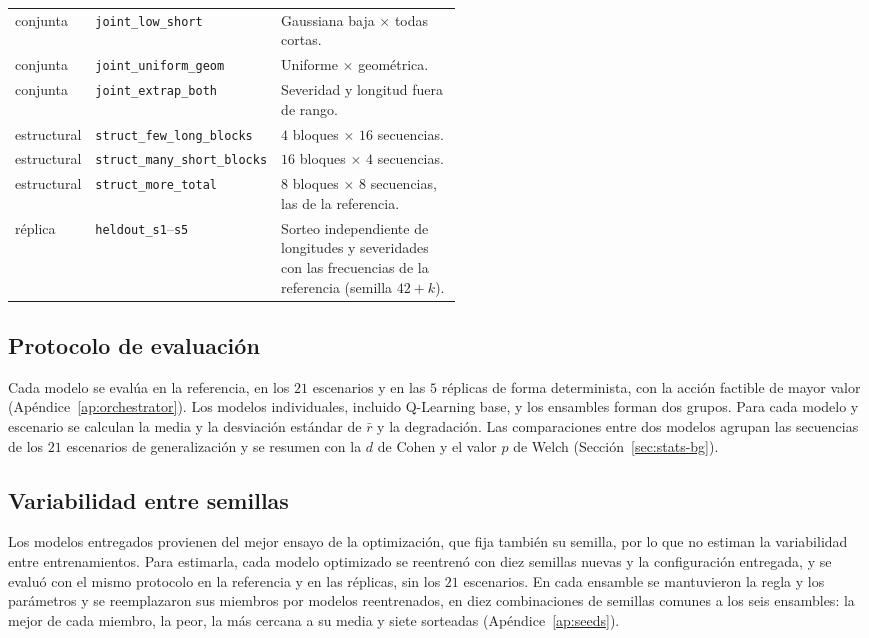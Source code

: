 \documentclass[../00_Main/Main.tex]{subfiles}
\begin{document}
\begin{table}[!htb]
\begin{tabular}{@{}llp{0.52\linewidth}@{}}
conjunta      & \texttt{joint\_low\_short}     & Gaussiana baja $\times$ todas cortas.\\
conjunta      & \texttt{joint\_uniform\_geom}  & Uniforme $\times$ geom\'etrica.\\
conjunta      & \texttt{joint\_extrap\_both}   & Severidad y longitud fuera de rango.\\
\midrule
estructural   & \texttt{struct\_few\_long\_blocks}  & $4$ bloques $\times$ $16$ secuencias.\\
estructural   & \texttt{struct\_many\_short\_blocks}& $16$ bloques $\times$ $4$ secuencias.\\
estructural   & \texttt{struct\_more\_total}        & $8$ bloques $\times$ $8$ secuencias, las de la referencia.\\
\midrule
r\'eplica      & \texttt{heldout\_s1}--\texttt{s5} & Sorteo independiente de longitudes y severidades con las frecuencias de la referencia (semilla $42 + k$).\\
\bottomrule
\end{tabular}
\end{table}

\subsection{Protocolo de evaluaci\'on}

Cada modelo se eval\'ua en la referencia, en los $21$ escenarios y en las $5$ r\'eplicas
de forma determinista, con la acci\'on factible de mayor valor
(Ap\'endice~\ref{ap:orchestrator}). Los modelos individuales, incluido
Q-Learning base, y los ensambles forman dos grupos. Para cada modelo y
escenario se calculan la media y la desviaci\'on est\'andar de $\bar r$ y
la degradaci\'on. Las comparaciones entre dos modelos agrupan las
secuencias de los $21$ escenarios de generalizaci\'on y se resumen con la
$d$ de Cohen y el valor $p$ de Welch (Secci\'on~\ref{sec:stats-bg}).

\subsection{Variabilidad entre semillas}\label{sec:seeds-methods}

Los modelos entregados provienen del mejor ensayo de la optimizaci\'on,
que fija tambi\'en su semilla, por lo que no estiman la variabilidad entre
entrenamientos. Para estimarla, cada modelo optimizado se reentren\'o con
diez semillas nuevas y la configuraci\'on entregada, y se evalu\'o con el
mismo protocolo en la referencia y en las r\'eplicas, sin los $21$
escenarios. En cada ensamble se mantuvieron la regla y los par\'ametros y
se reemplazaron sus miembros por modelos reentrenados, en diez
combinaciones de semillas comunes a los seis ensambles: la mejor de cada miembro,
la peor, la m\'as cercana a su media y siete sorteadas
(Ap\'endice~\ref{ap:seeds}).

\biblio %
\end{document}
